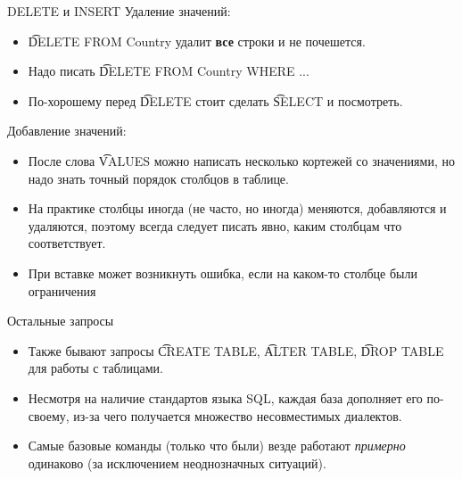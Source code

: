 \begin{frame}{DELETE и INSERT}
	Удаление значений:
	\begin{itemize}
		\item \t{DELETE FROM Country} удалит \textbf{все} строки и не почешется.
		\item Надо писать \t{DELETE FROM Country WHERE ...}
		\item По-хорошему перед \t{DELETE} стоит сделать \t{SELECT} и посмотреть.
	\end{itemize}
	Добавление значений:
	\begin{itemize}
		\item
			После слова \t{VALUES} можно написать несколько кортежей со значениями,
			но надо знать точный порядок столбцов в таблице.
		\item На практике столбцы иногда (не часто, но иногда) меняются, добавляются и удаляются,
			поэтому всегда следует писать явно, каким столбцам что соответствует.
		\item При вставке может возникнуть ошибка, если на каком-то столбце были ограничения
	\end{itemize}
\end{frame}

\begin{frame}{Остальные запросы}
	\begin{itemize}
		\item Также бывают запросы \t{CREATE TABLE}, \t{ALTER TABLE}, \t{DROP TABLE} для работы с таблицами.
		\item Несмотря на наличие стандартов языка SQL, каждая база дополняет его по-своему,
			из-за чего получается множество несовместимых диалектов.
		\item Самые базовые команды (только что были) везде работают \textit{примерно} одинаково
			(за исключением неоднозначных ситуаций).
	\end{itemize}
\end{frame}

